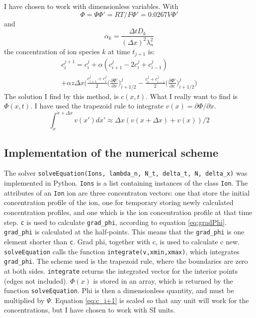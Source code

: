 \documentclass{article}
\begin{document}
I have chosen to work with dimensionless variables. With $$\Phi = \Psi\Phi' = RT/F\Phi' = 0.0267V \Phi'$$ and $$\alpha_k = \frac{\Delta t D_k}{(\Delta x)^2 \lambda_n^2}$$ the concentration of ion species $k$ at time $t_{j+1}$ is:
\begin{multline}\label{eq:c_i+1}
 c_i^{j+1}= c_i^j + \alpha(c_{i+1}^j-2c_i^j+c_{i-1}^j)\\ + \alpha z\Delta x \bigg(\frac{c_{i+1}^j+c_i^j}{2} \big(\frac{\partial \Phi'}{\partial x}\big)_{i+1/2}^j-\frac{c_{i}^j+c_{i-1}^j}{2} \big(\frac{\partial \Phi'}{\partial x}\big)_{i+1/2}^j\bigg)
\end{multline}
The solution I find by this method, is $c(x,t)$. What I really want to find is $\Phi(x,t)$. I have used the trapezoid rule to integrate $v(x) =\partial \Phi / \partial x$.
\begin{equation}
\int_x^{x+\Delta x}v(x') dx'  \approx \Delta x ( v(x+\Delta x) + v(x) )/2
\end{equation}

\subsection{Implementation of the numerical scheme}
The solver \texttt{solveEquation(Ions, lambda\_n, N\_t, delta\_t, N, delta\_x)} was implemented in Python.  \texttt{Ions} is a list containing instances of the class \texttt{Ion}. The attributes of an \texttt{Ion} ion are three concentraton vectors: one that store the initial concentration profile of the ion, one for temporary storing newly calculated concentration profiles, and one which is the ion concentration profile at that time step. \texttt{c} is used to calculate \texttt{grad\_phi}, according to equation \ref{eq:gradPhi}. \texttt{grad\_phi} is calculated at the half-points. This means that the \texttt{grad\_phi} is one element shorter than \texttt{c}.   Grad phi, together with c, is used to calculate c new. \texttt{solveEquation} calls the function \texttt{integrate(v,xmin,xmax)}, which integrates \texttt{grad\_phi}. The scheme used is the trapezoid rule, where the boundaries are zero at both sides. \texttt{integrate} returns the integrated vector for the interior points (edges not included). $\Phi(x)$ is stored in an array, which is returned by the function \texttt{solveEquation}. Phi is then a dimensionless quantity, and must be multiplied by $\Psi$. Equation \ref{eq:c_i+1} is scaled so that any unit will work for the concentrations, but I have chosen to work with SI units.  
\end{document}
